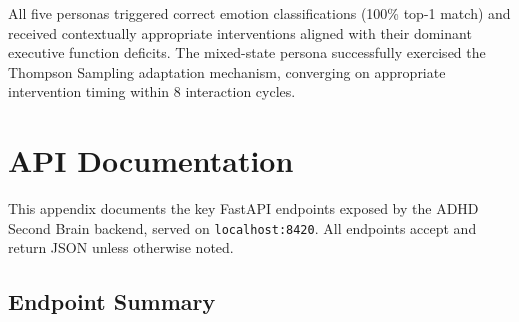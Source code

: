 All five personas triggered correct emotion classifications (100\% top-1 match) and received contextually appropriate interventions aligned with their dominant executive function deficits. The mixed-state persona successfully exercised the Thompson Sampling adaptation mechanism, converging on appropriate intervention timing within 8 interaction cycles.

\chapter{API Documentation}
\label{app:api-docs}

This appendix documents the key FastAPI endpoints exposed by the ADHD Second Brain backend, served on \texttt{localhost:8420}. All endpoints accept and return JSON unless otherwise noted.

\section{Endpoint Summary}

